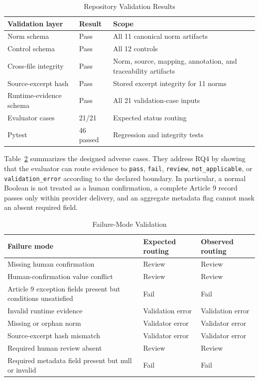 \documentclass[10pt,journal]{IEEEtran}
\begin{document}
\begin{table}[!t]
\centering
\footnotesize
\caption{Repository Validation Results}
\label{tab:validation-results}
\begin{tabularx}{\textwidth}{@{}p{}p{}p{}@{}}
\toprule
\textbf{Validation layer} & \textbf{Result} & \textbf{Scope} \\
\midrule
Norm schema & Pass & All 11 canonical norm artifacts \\
Control schema & Pass & All 12 controls \\
Cross-file integrity & Pass & Norm, source, mapping, annotation, and traceability artifacts \\
Source-excerpt hash & Pass & Stored excerpt integrity for 11 norms \\
Runtime-evidence schema & Pass & All 21 validation-case inputs \\
Evaluator cases & 21/21 & Expected status routing \\
Pytest & 46 passed & Regression and integrity tests \\
\bottomrule
\end{tabularx}
\end{table}

Table~\ref{tab:failure-modes} summarizes the designed adverse cases. They address RQ4 by showing that the evaluator can route evidence to \texttt{pass}, \texttt{fail}, \texttt{review}, \texttt{not\_applicable}, or \texttt{validation\_error} according to the declared boundary. In particular, a normal Boolean is not treated as a human confirmation, a complete Article 9 record passes only within provider delivery, and an aggregate metadata flag cannot mask an absent required field.

\begin{table}[!t]
\centering
\footnotesize
\caption{Failure-Mode Validation}
\label{tab:failure-modes}
\begin{tabularx}{\textwidth}{@{}p{}p{}p{}@{}}
\toprule
\textbf{Failure mode} & \textbf{Expected routing} & \textbf{Observed routing} \\
\midrule
Missing human confirmation & Review & Review \\
Human-confirmation value conflict & Review & Review \\
Article 9 exception fields present but conditions unsatisfied & Fail & Fail \\
Invalid runtime evidence & Validation error & Validation error \\
Missing or orphan norm & Validator error & Validator error \\
Source-excerpt hash mismatch & Validator error & Validator error \\
Required human review absent & Review & Review \\
Required metadata field present but null or invalid & Fail & Fail \\
\bottomrule
\end{tabularx}
\end{table}
\end{document}
